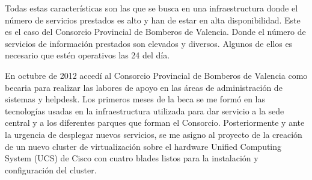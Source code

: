 \documentclass[12pt,a4paper,titlepage,twoside]{report}
\begin{document}
\par 
Todas estas características son las que se busca en una infraestructura donde el número de servicios prestados es alto y han de estar en alta disponibilidad. Este es el caso del Consorcio Provincial de Bomberos de Valencia. Donde el número de servicios de información prestados son elevados y diversos. Algunos de ellos es necesario que estén operativos las 24 del día. 
\par
En octubre de 2012 accedí al Consorcio Provincial de Bomberos de Valencia como becaria para realizar las labores de apoyo en las áreas de administración de sistemas y helpdesk. Los primeros meses de la beca se me formó en las tecnologías usadas en la infraestructura utilizada para dar servicio a la sede central y a los diferentes parques que forman el Consorcio. Posteriormente y ante la urgencia de desplegar nuevos servicios, se me asigno al proyecto de la creación de un nuevo cluster de virtualización sobre el hardware Unified Computing System (UCS) de Cisco con cuatro blades listos para la instalación y configuración del cluster.
\end{document}
